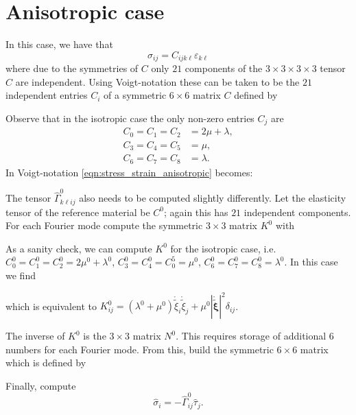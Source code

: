 \documentclass[11pt]{article}
\renewcommand{\vec}[1]{\boldsymbol{#1}}
\begin{document}
\section{Anisotropic case}
In this case, we have that
\begin{equation}
\sigma_{ij} = C_{ijk\ell}\varepsilon_{k\ell}\label{eqn:stress_strain_anisotropic}
\end{equation}
where due to the symmetries of $C$ only $21$ components of the $3\times 3\times 3 \times 3$ tensor $C$ are independent. Using Voigt-notation these can be taken to be the $21$ independent entries $C_{i}$ of a symmetric $6\times 6$ matrix $C$ defined by

Observe that in the isotropic case the only non-zero entries $C_j$ are
\begin{equation}
\begin{aligned}
C_0 = C_1 = C_2 &= 2\mu + \lambda,\\
C_3 = C_4 = C_5 &= \mu,\\
C_6 = C_7 = C_8 &= \lambda.
\end{aligned}
\end{equation}
In Voigt-notation \eqref{eqn:stress_strain_anisotropic} becomes:

The tensor $\widehat{\Gamma}^{0}_{k\ell ij}$ also needs to be computed slightly differently. Let the elasticity tensor of the reference material be $C^0$; again this has $21$ independent components.
For each Fourier mode compute the symmetric $3\times 3$ matrix $K^{0}$ with

As a sanity check, we can compute $K^0$ for the isotropic case, i.e. $C^0_0=C^0_1=C^0_2=2\mu^0+\lambda^0$, $C^0_3=C^0_4=C^5_0=\mu^0$, $C^0_6=C^0_7=C^0_8=\lambda^0$. In this case we find

which is equivalent to $K^0_{ij} = (\lambda^0+\mu^0)\mathring{\widetilde{\xi}}_i\mathring{\widetilde{\xi}}_j + \mu^0 |\mathring{\widetilde{\vec{\xi}}}|^2 \delta_{ij}$.

The inverse of $K^0$ is the $3\times 3$ matrix $N^{0}$. This requires storage of additional 6 numbers for each Fourier mode. From this, build the symmetric $6\times 6$ matrix which is defined by

Finally, compute
\begin{equation}
\widehat{\sigma}_i = -\widehat{\Gamma}^{0}_{ij} \widehat{\tau}_j.
\end{equation}
\end{document}
